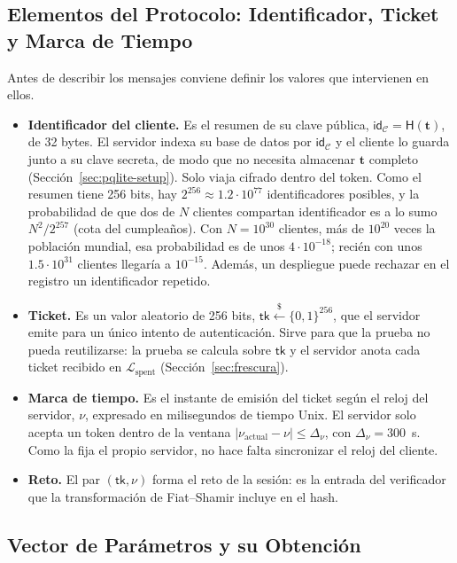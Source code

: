 \subsection{Elementos del Protocolo: Identificador, Ticket y Marca de Tiempo}
\label{sec:pqlite-elementos}

Antes de describir los mensajes conviene definir los valores que intervienen en ellos.

\begin{itemize}
    \item \textbf{Identificador del cliente.} Es el resumen de su clave pública, $\mathsf{id}_{\mathcal{C}} = \mathsf{H}(\mathbf{t})$, de 32 bytes. El servidor indexa su base de datos por $\mathsf{id}_{\mathcal{C}}$ y el cliente lo guarda junto a su clave secreta, de modo que no necesita almacenar $\mathbf{t}$ completo (Sección~\ref{sec:pqlite-setup}). Solo viaja cifrado dentro del token. Como el resumen tiene 256 bits, hay $2^{256} \approx 1.2 \cdot 10^{77}$ identificadores posibles, y la probabilidad de que dos de $N$ clientes compartan identificador es a lo sumo $N^2/2^{257}$ (cota del cumpleaños). Con $N = 10^{30}$ clientes, más de $10^{20}$ veces la población mundial, esa probabilidad es de unos $4 \cdot 10^{-18}$; recién con unos $1.5 \cdot 10^{31}$ clientes llegaría a $10^{-15}$. Además, un despliegue puede rechazar en el registro un identificador repetido.
    \item \textbf{Ticket.} Es un valor aleatorio de 256 bits, $\mathsf{tk} \xleftarrow{\$} \{0,1\}^{256}$, que el servidor emite para un único intento de autenticación. Sirve para que la prueba no pueda reutilizarse: la prueba se calcula sobre $\mathsf{tk}$ y el servidor anota cada ticket recibido en $\mathcal{L}_{\text{spent}}$ (Sección~\ref{sec:frescura}).
    \item \textbf{Marca de tiempo.} Es el instante de emisión del ticket según el reloj del servidor, $\nu$, expresado en milisegundos de tiempo Unix. El servidor solo acepta un token dentro de la ventana $|\nu_{\text{actual}} - \nu| \le \Delta_\nu$, con $\Delta_\nu = 300$~s. Como la fija el propio servidor, no hace falta sincronizar el reloj del cliente.
    \item \textbf{Reto.} El par $(\mathsf{tk}, \nu)$ forma el reto de la sesión: es la entrada del verificador que la transformación de Fiat--Shamir incluye en el hash.
\end{itemize}

\subsection{Vector de Parámetros y su Obtención}
\label{sec:pqlite-parametros}

